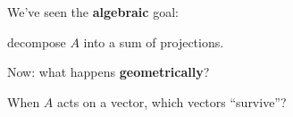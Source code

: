 \documentclass[10pt]{beamer}
\theoremstyle{definition}
\newcommand{\x}[1]{\alert{\textbf{#1}}}
\begin{document}
\begin{frame}{}

\vfill

\begin{center}
{\Large We've seen the \x{algebraic} goal:}

\vspace{0.5cm}

{\large decompose $A$ into a sum of projections.}

\vspace{1cm}

{\Large Now: what happens \x{geometrically}?}

\vspace{0.5cm}

{\large When $A$ acts on a vector, which vectors ``survive''?}
\end{center}

\vfill

\end{frame}
\end{document}
